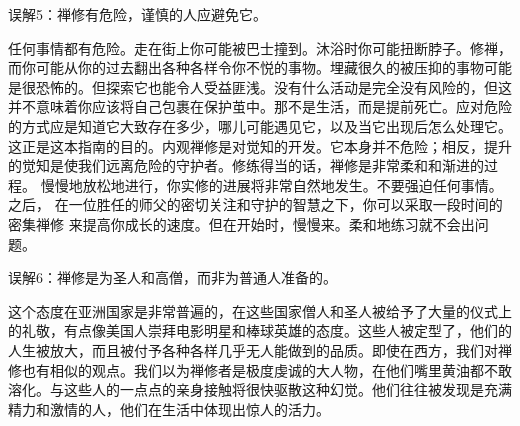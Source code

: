 \subsectnon 误解5：禅修有危险，谨慎的人应避免它。

任何事情都有危险。走在街上你可能被巴士撞到。沐浴时你可能扭断脖子。修禅，
而你可能从你的过去翻出各种各样令你不悦的事物。埋藏很久的被压抑的事物可能
是很恐怖的。但探索它也能令人受益匪浅。没有什么活动是完全没有风险的，但这
并不意味着你应该将自己包裹在保护茧中。那不是生活，而是提前死亡。应对危险
的方式应是知道它大致存在多少，哪儿可能遇见它，以及当它出现后\1怎么处理它。
这正是这本指南的目的。内观禅修是对觉知的开发。它本身并不危险；相反，提升
的觉知是使我们远离危险的守护者。修练得当的话，禅修是非常柔和和渐进的过程。
慢慢地放松地进行，你实修的进展将非常自然地发生。不要强迫任何事情。之后，
在一位胜任的师父的密切关注和守护的智慧之下，你可以采取一段时间的密集禅修
来提高你成长的速度。但在开始时，慢慢来。柔和地练习就不会出问题。

\subsectnon 误解6：禅修是为圣人和高僧，而非为普通人准备的。

这个态度在亚洲国家是非常普遍的，在这些国家僧人和圣人被给予了大量的仪式上
的礼敬，有点像美国人崇拜电影明星和棒球英雄的态度。这些人被定型了，他们的
人生被放大，而且被付予各种各样几乎无人能做到的品质。即使在西方，我们对禅
修也有相似的观点。我们以为禅修者是极度虔诚的大人物，在他们嘴里黄油都不敢
溶化。与这些人的一点点的亲身接触将很快驱散这种幻觉。他们往往被发现是充满
精力和激情的人，他们在生活中体现出惊人的活力。

\endchapter

\byebye
